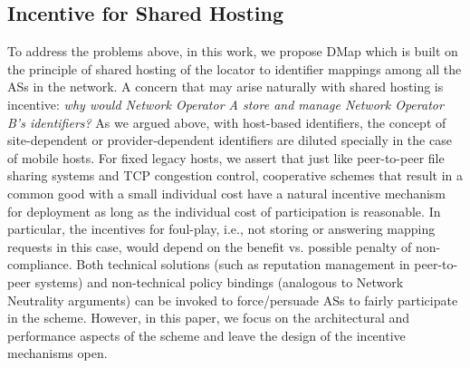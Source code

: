 \subsection{Incentive for Shared Hosting}

To address the problems above, in this work, we propose DMap which is
built on the principle of shared hosting of the locator to identifier
mappings among all the ASs in the network.  A concern that may arise
naturally with shared hosting is incentive: \emph{why
  would Network Operator A store and manage Network Operator B's
  identifiers?} As we argued above, with host-based identifiers, the
concept of site-dependent or provider-dependent identifiers are
diluted specially in the case of mobile hosts. For fixed legacy hosts,
we assert that just like peer-to-peer file sharing systems and TCP
congestion control, cooperative schemes that result in a common good
with a small individual cost have a natural incentive mechanism for
deployment as long as the individual cost of participation is
reasonable. In particular, the incentives for foul-play, i.e., not
storing or answering mapping requests in this case, would depend on
the benefit vs. possible penalty of non-compliance. Both technical
solutions (such as reputation management in peer-to-peer systems) and
non-technical policy bindings (analogous to Network Neutrality
arguments) can be invoked to force/persuade ASs to fairly participate
in the scheme. However, in this paper, we focus on the architectural
and performance aspects of the scheme and leave the design of the
incentive mechanisms open.


